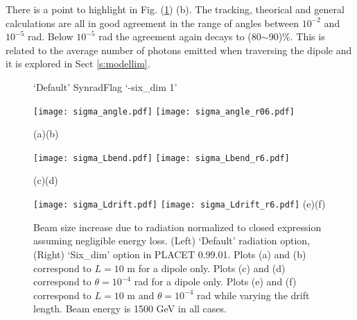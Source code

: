 There is a point to highlight in Fig. (\ref{figSR}) (b). The tracking, theorical and general calculations are all in good agreement in the range of angles between $10^{-2}$ and $10^{-5}$ rad. Below $10^{-5}$ rad the agreement again decays to (80$\sim$90)\%. This is related to the average number of photons emitted when traversing the dipole and it is explored in Sect \ref{s:modellim}.\par
\begin{figure}[htb]
\centering
  \hspace*{1.2cm}`Default' Synrad\hspace*{5.0cm}Flag `-six\_dim 1'\par
 \texttt{[image: sigma\_angle.pdf]}
  \texttt{[image: sigma\_angle\_r06.pdf]}\par
  \hspace*{1.0cm}(a)\hspace*{7.6cm}(b)\par
   \texttt{[image: sigma\_Lbend.pdf]}
  \texttt{[image: sigma\_Lbend\_r6.pdf]}\par
  \hspace*{1.0cm}(c)\hspace*{7.6cm}(d)\par
  \texttt{[image: sigma\_Ldrift.pdf]}
  \texttt{[image: sigma\_Ldrift\_r6.pdf]}
  \hspace*{1.0cm}(e)\hspace*{7.6cm}(f)\par
\caption{Beam size increase due to radiation normalized to closed expression assuming negligible energy loss. (Left) `Default' radiation option, (Right) `Six\_dim' option in PLACET 0.99.01. Plots (a) and (b) correspond to $L=10$ m for a dipole only. Plots (c) and (d) correspond to $\theta=10^{-4}$ rad for a dipole only. Plots (e) and (f) correspond to $L=10$ m and $\theta=10^{-4}$ rad while varying the drift length. Beam energy is 1500 GeV in all cases.}\label{figSR}
\end{figure}
\clearpage
